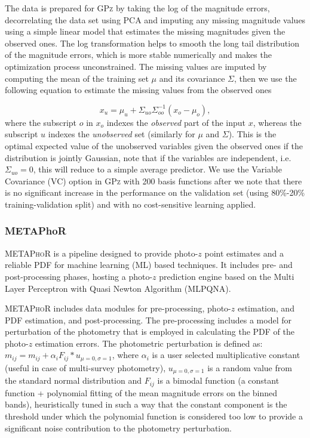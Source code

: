 The data is prepared for \textsc{GPz} by taking the log of the magnitude errors, decorrelating the data set using PCA and imputing any missing magnitude values using a simple linear model that estimates the missing magnitudes given the observed ones. The log transformation helps to smooth the long tail distribution of the magnitude errors, which is more stable numerically and makes the optimization process unconstrained. The missing values are imputed by computing the mean of the training set $\mu$ and its covariance $\Sigma$, then we use the following equation to estimate the missing values from the observed ones %

\begin{equation}
x_{u} = \mu_{u}+\Sigma_{uo}\Sigma_{oo}^{-1}(x_{o}-\mu_{o}),
\end{equation}  %
where the subscript $o$ in $x_{o}$ indexes the \emph{observed} part of the input $x$, whereas the subscript $u$ indexes the \emph{unobserved} set (similarly for $\mu$ and $\Sigma$). This is the optimal expected value of the unobserved variables given the observed ones if the distribution is jointly Gaussian, note that if the variables are independent, i.e. $\Sigma_{uo}=0$, this will reduce to a simple average predictor.  We use the Variable Covariance (VC) option in \textsc{GPz} with 200 basis functions after we note that there is no significant increase in the performance on the validation set (using 80\%-20\% training-validation split) and with no cost-sensitive learning applied. 

\subsubsection{METAPhoR}
\label{sec:metaphor}
\textsc{METAPhoR} \citep[Machine-learning Estimation Tool for Accurate Photometric Redshifts,][]{Cavuoti:17} is a pipeline designed to provide photo-$z$ point estimates and a reliable PDF for machine learning (ML) based techniques. It includes pre- and post-processing phases, hosting a photo-$z$ prediction engine based on the Multi Layer Perceptron with Quasi Newton Algorithm (MLPQNA).

\textsc{METAPhoR} includes data modules for pre-processing, photo-$z$ estimation, and PDF estimation, and post-processing.  The pre-processing includes a model for perturbation of the photometry that is employed in calculating the PDF of the photo-$z$ estimation errors.  The photometric perturbation is defined as: $m_{ij} = m_{ij} + \alpha_{i}F_{ij}*u_{\mu=0,\sigma=1}$, where $\alpha_{i}$ is a user selected multiplicative constant (useful in case of multi-survey photometry), $u_{\mu=0,\sigma=1}$ is a random value from the standard normal distribution and $F_{ij}$ is a bimodal function (a constant function + polynomial fitting of the mean magnitude errors on the binned bands), heuristically tuned in such a way that the constant component is the threshold under which the polynomial function is considered too low to provide a significant noise contribution to the photometry perturbation.

